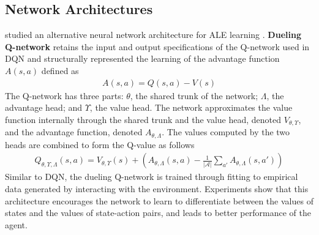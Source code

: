 \subsection{Network Architectures}
\citeauthor{DuelingNetworkArchitectures_Wang.Schaul.ea_2016} studied an alternative neural network architecture for ALE learning \cite{DuelingNetworkArchitectures_Wang.Schaul.ea_2016}.
\textbf{Dueling Q-network} retains the input and output specifications of the Q-network used in DQN and structurally represented the learning of the advantage function $A(s, a)$ defined as
\begin{align*}
    A(s, a) = Q(s, a) - V(s)
\end{align*}
The Q-network has three parts:
$\theta$, the shared trunk of the network; $\varLambda$, the advantage head; and $\varUpsilon$, the value head.
The network approximates the value function internally through the shared trunk and the value head, denoted $V_{\theta, \varUpsilon}$, and the advantage function, denoted $A_{\theta, \varLambda}$.
The values computed by the two heads are combined to form the Q-value as follows
\begin{align*}
    Q_{\theta, \varUpsilon, \varLambda}(s, a)
    = V_{\theta, \varUpsilon}(s)
    + \left( A_{\theta, \varLambda}(s, a)
    - \frac{1}{| \mathcal{A} | } \sum_{a'}A_{\theta, \varLambda}(s, a') \right)
\end{align*}
Similar to DQN, the dueling Q-network is trained through fitting to empirical data generated by interacting with the environment.
Experiments show that this architecture encourages the network to learn to differentiate between the values of states and the values of state-action pairs, and leads to better performance of the agent.


